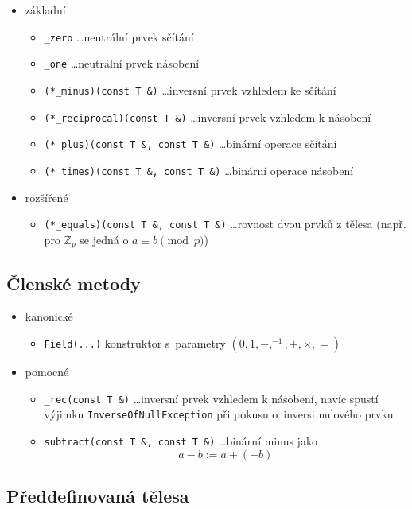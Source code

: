 \documentclass[11pt,a4paper]{article}
\theoremstyle{remark}
\begin{document}
\begin{itemize}
  \item základní
  \begin{itemize}
    \item \verb=_zero= \ldots neutrální prvek sčítání
    \item \verb=_one= \ldots neutrální prvek násobení
    \item \verb=(*_minus)(const T &)= \ldots inversní prvek vzhledem ke sčítání
    \item \verb=(*_reciprocal)(const T &)= \ldots inversní prvek vzhledem k
      násobení
    \item \verb=(*_plus)(const T &, const T &)= \ldots binární operace sčítání
    \item \verb=(*_times)(const T &, const T &)= \ldots binární operace
      násobení
  \end{itemize}
  \item rozšířené
  \begin{itemize}
    \item \verb=(*_equals)(const T &, const T &)= \ldots rovnost dvou prvků z
      tělesa (např. pro $\mathbb{Z}_p$ se jedná o $a \equiv b \pmod p$)
  \end{itemize}
\end{itemize}

\subsection{Členské metody}

\begin{itemize}
  \item kanonické
  \begin{itemize}
    \item \verb=Field(...)= konstruktor s~parametry $(0, 1, -, ^{-1}, +,
      \times, =)$
  \end{itemize}
  \item pomocné
  \begin{itemize}
    \item \verb=_rec(const T &)= \ldots inversní prvek vzhledem k násobení,
      navíc spustí výjimku \verb=InverseOfNullException= při pokusu o~inversi
      nulového prvku
    \item \verb=subtract(const T &, const T &)= \ldots binární minus jako
      \[
        a - b := a + (-b)
      \]
  \end{itemize}
\end{itemize}

\subsection{Předdefinovaná tělesa}
 
\end{document}
